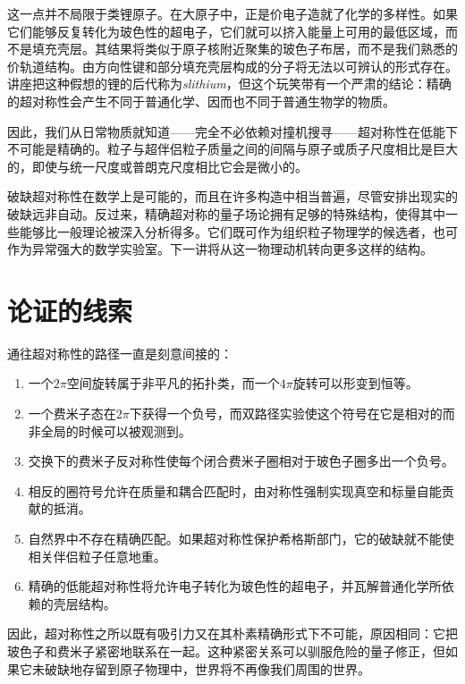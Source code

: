 这一点并不局限于类锂原子。在大原子中，正是价电子造就了化学的多样性。如果它们能够反复转化为玻色性的超电子，它们就可以挤入能量上可用的最低区域，而不是填充壳层。其结果将类似于原子核附近聚集的玻色子布居，而不是我们熟悉的价轨道结构。由方向性键和部分填充壳层构成的分子将无法以可辨认的形式存在。讲座把这种假想的锂的后代称为\emph{slithium}，但这个玩笑带有一个严肃的结论：精确的超对称性会产生不同于普通化学、因而也不同于普通生物学的物质。

\begin{classroomqa}
\end{classroomqa}

因此，我们从日常物质就知道——完全不必依赖对撞机搜寻——超对称性在低能下不可能是精确的。粒子与超伴侣粒子质量之间的间隔与原子或质子尺度相比是巨大的，即使与统一尺度或普朗克尺度相比它会是微小的。

\begin{classroomqa}
\end{classroomqa}

破缺超对称性在数学上是可能的，而且在许多构造中相当普遍，尽管安排出现实的破缺远非自动。反过来，精确超对称的量子场论拥有足够的特殊结构，使得其中一些能够比一般理论被深入分析得多。它们既可作为组织粒子物理学的候选者，也可作为异常强大的数学实验室。下一讲将从这一物理动机转向更多这样的结构。

\section{论证的线索}

通往超对称性的路径一直是刻意间接的：
\begin{enumerate}
\item 一个\(2\pi\)空间旋转属于非平凡的拓扑类，而一个\(4\pi\)旋转可以形变到恒等。
\item 一个费米子态在\(2\pi\)下获得一个负号，而双路径实验使这个符号在它是相对的而非全局的时候可以被观测到。
\item 交换下的费米子反对称性使每个闭合费米子圈相对于玻色子圈多出一个负号。
\item 相反的圈符号允许在质量和耦合匹配时，由对称性强制实现真空和标量自能贡献的抵消。
\item 自然界中不存在精确匹配。如果超对称性保护希格斯部门，它的破缺就不能使相关伴侣粒子任意地重。
\item 精确的低能超对称性将允许电子转化为玻色性的超电子，并瓦解普通化学所依赖的壳层结构。
\end{enumerate}

因此，超对称性之所以既有吸引力又在其朴素精确形式下不可能，原因相同：它把玻色子和费米子紧密地联系在一起。这种紧密关系可以驯服危险的量子修正，但如果它未破缺地存留到原子物理中，世界将不再像我们周围的世界。